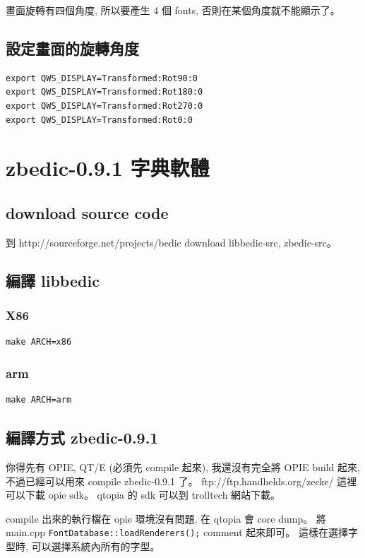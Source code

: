 \documentclass[12pt,a4paper]{article}
\begin{document}
\begin{CJK}{UTF8}{bsmi}
畫面旋轉有四個角度, 所以要產生 4 個 fonts, 否則在某個角度就不能顯示了。

\subsection{設定畫面的旋轉角度}
\begin{verbatim}
export QWS_DISPLAY=Transformed:Rot90:0
export QWS_DISPLAY=Transformed:Rot180:0
export QWS_DISPLAY=Transformed:Rot270:0
export QWS_DISPLAY=Transformed:Rot0:0
\end{verbatim}

\section{zbedic-0.9.1 字典軟體}
\subsection{download source code}
到 http://sourceforge.net/projects/bedic download libbedic-src, zbedic-src。


\subsection{編譯 libbedic}
\subsubsection{X86}
\begin{verbatim}
make ARCH=x86
\end{verbatim}
\subsubsection{arm}
\begin{verbatim}
make ARCH=arm
\end{verbatim}


\subsection{編譯方式 zbedic-0.9.1}
你得先有 OPIE, QT/E (必須先 compile 起來),
我還沒有完全將 OPIE build 起來, 
不過已經可以用來 compile zbedic-0.9.1 了。
ftp://ftp.handhelds.org/zecke/ 這裡可以下載 opie sdk。
qtopia 的 sdk 可以到 trolltech 網站下載。

compile 出來的執行檔在 opie 環境沒有問題, 在 qtopia 會 core dump。
將 main.cpp \verb+FontDatabase::loadRenderers();+
comment 起來即可。
這樣在選擇字型時, 可以選擇系統內所有的字型。


\end{CJK}
\end{document}
